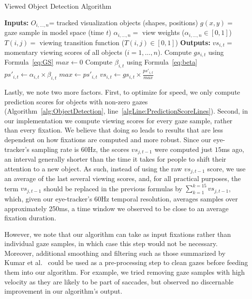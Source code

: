 \begin{algorithm}
\caption{Viewed Object Detection Algorithm}
\label{alg:ObjectDetection}
\begin{algorithmic}[1]
\State \textbf{Inputs: } 
\Statex $O_{i, \ldots, n}$= tracked visualization objects (shapes, positions)
\Statex $g(x,y) = $ gaze sample in model space (time $t$)
\Statex $\alpha_{i, \ldots, n} = $ view weights ($\alpha_{i, \ldots, n} \in [0,1]$)
\Statex $T(i,j) = $ viewing transition function ($T(i,j) \in [0,1]$)
\State \textbf{Outputs:}
\Statex $vs_{i,t} = $ momentary viewing scores of all objects ($i = 1, \ldots, n$). 
	\State Compute $gs_{i,t}$	using Formula~\ref{eq:GS}
\EndFor
\State $max \gets 0$
	 \label{algLine:PredictionScoreLines}
		\State Compute $\beta_{i,t}$	using Formula~\ref{eq:beta}
		\State $ps'_{i,t} \gets \alpha_{i,t} \times \beta_{i,t}$
			\State $max \gets ps'_{i,t}$
		\EndIf
	\EndIf
\EndFor
{}
	\State $vs_{i,t} \gets gs_{i,t} \times \frac{ps'_{i,t}}{max} $
\EndFor
\end{algorithmic}
\end{algorithm}

Lastly, we note two more factors. First, to optimize for speed, we only compute prediction scores for objects with non-zero gazes (Algorithm~\ref{alg:ObjectDetection}, line~\ref{algLine:PredictionScoreLines}). Second, in our implementation we compute viewing scores for every gaze sample, rather than every fixation. We believe that doing so leads to results that are less dependent on how fixations are computed and more robust. Since our eye-tracker's sampling rate is $60$Hz, the scores $vs_{j, t-1}$ were computed just $15$ms ago, an interval generally shorter than the time it takes for people to shift their attention to a new object. As such, instead of using the raw $vs_{j,t-1}$ score, we use an average of the last several viewing scores, and, for all practical purposes, the term $vs_{j,t-1}$ should be replaced in the previous formulas by $ \sum_{k=1}^{k=15}{vs_{j,t-1}}$, which, given our eye-tracker's 60Hz temporal resolution, averages samples over approximately 250ms, a time window we observed to be close to an average fixation duration.  

However, we note that our algorithm can take as input fixations rather than individual gaze samples, in which case this step would not be necessary. Moreover, additional smoothing and filtering such as those summarized by Kumar et al.~\cite{kumar2008improving} could be used as a pre-processing step to clean gazes before feeding them into our algorithm. For example, we tried removing gaze samples with high velocity as they are likely to be part of saccades, but observed no discernable improvement in our algorithm's output. 


